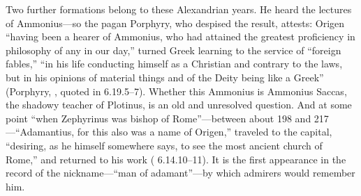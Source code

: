 Two further formations belong to these Alexandrian years. He heard the
lectures of Ammonius---so the pagan Porphyry, who despised the result,
attests: Origen ``having been a hearer of Ammonius, who had attained the
greatest proficiency in philosophy of any in our day,'' turned Greek learning
to the service of ``foreign fables,'' ``in his life conducting himself as a
Christian and contrary to the laws, but in his opinions of material things
and of the Deity being like a Greek'' (Porphyry, , quoted in  6.19.5--7). Whether this
Ammonius is Ammonius Saccas, the shadowy teacher of Plotinus, is an old and
unresolved question. And at some point ``when Zephyrinus was bishop of
Rome''---between about 198 and 217---``Adamantius, for this also was a name
of Origen,'' traveled to the capital, ``desiring, as he himself somewhere
says, to see the most ancient church of Rome,'' and returned to his work
( 6.14.10--11). It is the first appearance in the record
of the nickname---``man of adamant''---by which admirers would remember him.
